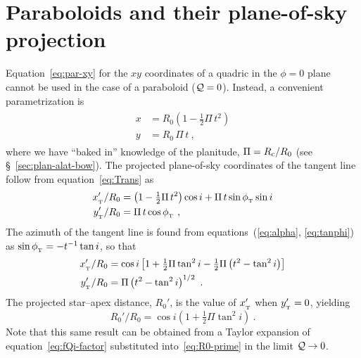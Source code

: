 \section{Paraboloids and their plane-of-sky projection}
\label{app:parabola}

Equation~\eqref{eq:par-xy} for the \(xy\) coordinates of a quadric in the \(\phi = 0\) plane cannot be used in the case of a paraboloid (\(\mathcal{Q} = 0\)).  Instead, a convenient parametrization is
\begin{gather}
  \label{eq:parabola-xy}
  \begin{aligned}
    x &= R_0 \left(1  - \tfrac{1}{2} \Pi\, t^2\right) \\
    y &= R_0\, \Pi\, t \ ,
  \end{aligned}
\end{gather}
where we have ``baked in'' knowledge of the planitude,
\(\Pi = R_{\mathrm{c}}/R_0\) (see \S~\ref{sec:plan-alat-bow}). The projected
plane-of-sky coordinates of the tangent line follow from
equation~\eqref{eq:Trans} as
\begin{gather}
  \label{eq:parabola-xy-prime-phi}
  \begin{aligned}
    x_{_{\mathrm{\scriptscriptstyle T}}}' / R_0 &= \left(1 - \tfrac{1}{2} \Pi\, t^2\right) \cos i
      + \Pi\, t \sin\phi_{_{\mathrm{\scriptscriptstyle T}}} \sin i\\
    y_{_{\mathrm{\scriptscriptstyle T}}}' / R_0 &= \Pi\, t \cos\phi_{_{\mathrm{\scriptscriptstyle T}}}\ ,
  \end{aligned}
\end{gather}
The azimuth of the tangent line is found from
equations~(\ref{eq:alpha}, \ref{eq:tanphi}) as
\(\sin\phi_{_{\mathrm{\scriptscriptstyle T}}} = -t^{-1} \tan i \), so that
\begin{gather}
  \label{eq:parabola-xy-prime-final}
  \begin{aligned}
    x_{_{\mathrm{\scriptscriptstyle T}}}' / R_0 &= \cos i \left[ 1 + \tfrac{1}{2} \Pi \tan^2 i -
      \tfrac{1}{2} \Pi \left( t^2 - \tan^2 i \right) \right]\\
    y_{_{\mathrm{\scriptscriptstyle T}}}' / R_0 &= \Pi \left( t^2 - \tan^2 i \right)^{1/2} \ .
  \end{aligned}
\end{gather}
The projected star--apex distance, \(R_0'\), is the value of
\(x_{_{\mathrm{\scriptscriptstyle T}}}'\) when \(y_{_{\mathrm{\scriptscriptstyle T}}}' = 0\), yielding
\begin{equation}
  \label{eq:parabola-R0-prime}
  R_0' / R_0 = \cos i \left( 1 + \tfrac{1}{2} \Pi \tan^2 i  \right) \ . 
\end{equation}
Note that this same result can be obtained from a Taylor expansion of
equation~\eqref{eq:fQi-factor} substituted into~\eqref{eq:R0-prime} in
the limit \(\mathcal{Q} \to 0\).

